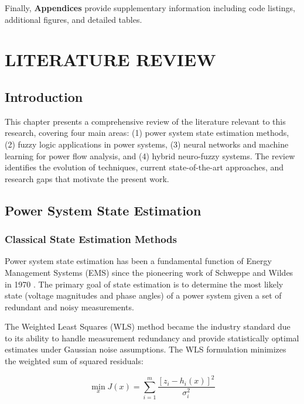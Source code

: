 \documentclass[12pt,a4paper]{report}
\begin{document}
Finally, \textbf{Appendices} provide supplementary information including code listings, additional figures, and detailed tables.

\chapter{LITERATURE REVIEW}

\section{Introduction}

This chapter presents a comprehensive review of the literature relevant to this research, covering four main areas: (1) power system state estimation methods, (2) fuzzy logic applications in power systems, (3) neural networks and machine learning for power flow analysis, and (4) hybrid neuro-fuzzy systems. The review identifies the evolution of techniques, current state-of-the-art approaches, and research gaps that motivate the present work.

\section{Power System State Estimation}

\subsection{Classical State Estimation Methods}

Power system state estimation has been a fundamental function of Energy Management Systems (EMS) since the pioneering work of Schweppe and Wildes in 1970 \cite{schweppe1970}. The primary goal of state estimation is to determine the most likely state (voltage magnitudes and phase angles) of a power system given a set of redundant and noisy measurements.

The Weighted Least Squares (WLS) method became the industry standard due to its ability to handle measurement redundancy and provide statistically optimal estimates under Gaussian noise assumptions. The WLS formulation minimizes the weighted sum of squared residuals:

\begin{equation}
    \min_{x} J(x) = \sum_{i=1}^{m} \frac{[z_i - h_i(x)]^2}{\sigma_i^2}
\end{equation}
\end{document}
